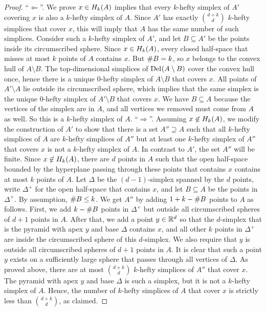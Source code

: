 \documentclass[10pt,a4paper]{article}
\newcommand {\mm}[1] {\ifmmode{#1}\else{\mbox{\(#1\)}}\fi}
\theoremstyle{plain}
\newcommand{\Rspace}        {\mm{{\mathbb R}}}
\newcommand{\Delaunay}[2]   {\mm{{\rm Del}_{#1}{({#2})}}}
\newcommand{\Hull}[2]       {\mm{{H}_{#1}{({#2})}}}
\newcommand{\card}[1]       {\mm{{\#}{#1}}}
\begin{document}
\begin{proof}
  \smallskip
  ``$\Longleftarrow$''.
  We prove $x \in \Hull{k}{A}$ implies that every $k$-hefty simplex of $A'$ covering $x$ is also a $k$-hefty simplex of $A$.
  Since $A'$ has exactly $\binom{d+k}{d}$ $k$-hefty simplices that cover $x$, this will imply that $A$ has the same number of such simplices.
  Consider such a $k$-hefty simplex of $A'$, and let $B \subseteq A'$ be the points inside its circumscribed sphere.
  Since $x \in \Hull{k}{A}$, every closed half-space that misses at most $k$ points of $A$ contains $x$.
  But $\card{B} = k$, so $x$ belongs to the convex hull of $A \setminus B$.
  The top-dimensional simplices of $\Delaunay{}{A \setminus B}$ cover the convex hull once, hence there is a unique $0$-hefty simplex of $A \setminus B$ that covers $x$.
  All points of $A' \setminus A$ lie outside its circumscribed sphere, which implies that the same simplex is the unique $0$-hefty simplex of $A'\setminus B$ that covers $x$.
  We have $B \subseteq A$ because the vertices of the simplex are in $A$, and all vertices we removed must come from $A$ as well.
  So this is a $k$-hefty simplex of $A$.
  \smallskip
  ``$\Longrightarrow$''.
  Assuming $x \not\in \Hull{k}{A}$, we modify the construction of $A'$ to show that there is a set $A'' \supseteq A$ such that all $k$-hefty simplices of $A$ are $k$-hefty simplices of $A''$ but at least one $k$-hefty simplex of $A''$ that covers $x$ is not a $k$-hefty simplex of $A$.
  In contrast to $A'$, the set $A''$ will be finite.
  Since $x \not\in \Hull{k}{A}$, there are $d$ points in $A$ such that the open half-space bounded by the hyperplane passing through these points that contains $x$ contains at most $k$ points of $A$.
  Let $\Delta$ be the $(d-1)$-simplex spanned by the $d$ points, write $\Delta^+$ for the open half-space that contains $x$, and let $B \subseteq A$ be the points in $\Delta^+$.
  By assumption, $\card{B} \leq k$.
  We get $A''$ by adding $1 + k - \card{B}$ points to $A$ as follows.
  First, we add $k-\card{B}$ points in $\Delta^+$ but outside all circumscribed spheres of $d+1$ points in $A$.
  After that, we add a point $y \in \Rspace^d$ so that the $d$-simplex that is the pyramid with apex $y$ and base $\Delta$ contains $x$, and all
  other $k$ points in $\Delta^+$ are inside the circumscribed sphere of this $d$-simplex. 
  We also require that $y$ is outside all circumscribed spheres of $d+1$ points in $A$.
  It is clear that such a point $y$ exists on a sufficiently large sphere that passes through all vertices of $\Delta$.
  As proved above, there are at most $\binom{d+k}{d}$ $k$-hefty simplices of $A''$ that cover $x$.
  The pyramid with apex $y$ and base $\Delta$ is such a simplex, but it is not a $k$-hefty simplex of $A$.
  Hence, the number of $k$-hefty simplices of $A$ that cover $x$ is strictly less than $\binom{d+k}{d}$, as claimed.
\end{proof}
\end{document}

